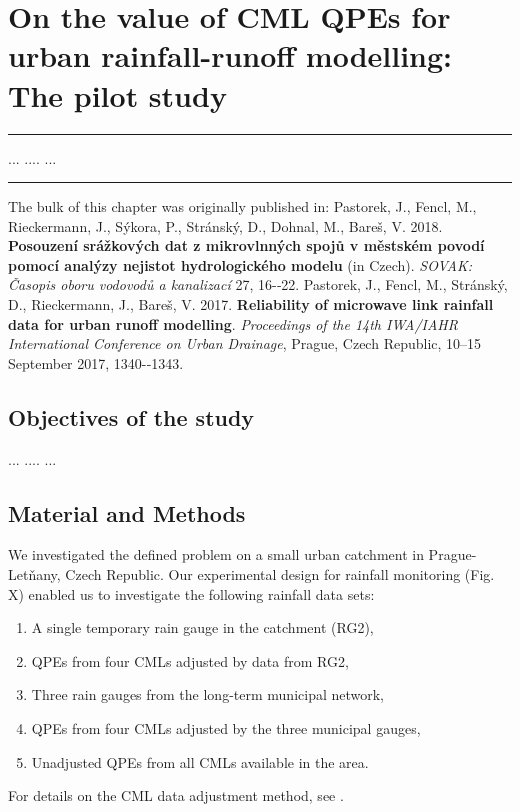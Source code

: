 \documentclass{ctuthesis}\usepackage[]{graphicx}\usepackage[]{color}
\begin{document}

\chapter{On the value of CML QPEs for urban rainfall-runoff modelling: The pilot study} \label{chap3}

\rule{\textwidth}{0.4pt}
... \newline
....\newline
... \newline
\rule[0.2cm]{\textwidth}{0.4pt}

{\footnotesize The bulk of this chapter was originally published in: \newline
\-\hspace{0.5cm}
Pastorek, J., Fencl, M., Rieckermann, J., Sýkora, P., Stránský, D., Dohnal, M., Bareš, V. 2018. \textbf{Posouzení srážkových dat z mikrovlnných spojů v městském povodí pomocí analýzy nejistot hydrologického modelu} (in Czech). \emph{SOVAK: Časopis oboru vodovodů a kanalizací} 27, 16-‐22. \newline
\-\hspace{0.5cm}
Pastorek, J., Fencl, M., Stránský, D., Rieckermann, J., Bareš, V. 2017. \textbf{Reliability of microwave link rainfall data for urban runoff modelling}. \emph{Proceedings of the 14th IWA/IAHR International Conference on Urban Drainage}, Prague, Czech Republic, 10--15 September 2017, 1340-‐1343.
}
\newpage


\section{Objectives of the study}

...
....
...

 
\section{Material and Methods} \label{paperIMnM}

We investigated the defined problem on a small urban catchment in Prague-Letňany, Czech Republic. Our experimental design for rainfall monitoring (Fig. X) enabled us to investigate the following rainfall data sets: 
\begin{enumerate}
        \item A single temporary rain gauge in the catchment (RG2),
        \item QPEs from four CMLs adjusted by data from RG2, 
        \item Three rain gauges from the long-term municipal network,
        \item QPEs from four CMLs adjusted by the three municipal gauges,
        \item Unadjusted QPEs from all CMLs available in the area.
\end{enumerate}
For details on the CML data adjustment method, see \cite{fenclGaugeadjustedRainfallEstimates2017}. 
\end{document}
